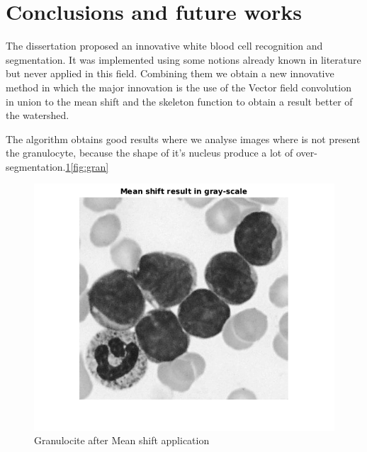 \section{Conclusions and future works}
The dissertation proposed an innovative white blood cell recognition and segmentation. It was implemented using some notions already known in literature but never applied in this field. Combining them we obtain a new innovative method in which the major innovation is the use of the Vector field convolution in union to the mean shift and the skeleton function to obtain a result better of the watershed.

\bigskip

The algorithm obtains good results where we analyse images where is not present the granulocyte, because the shape of it's nucleus produce a lot of over-segmentation.\ref{fig:grangray}\ref{fig:gran}
\begin{figure}
\begin{center}
		\includegraphics[scale=0.5]{img/final/meangran.png}
		\caption{Granulocite after Mean shift application}
		\label{fig:grangray}
\end{center}
\end{figure}
